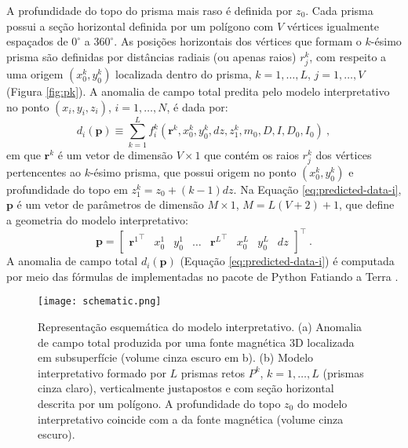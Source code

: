 A profundidade do topo do prisma mais raso é definida por $z_{0}$.
Cada prisma possui a seção horizontal definida por um polígono com $V$ vértices igualmente espaçados de $0^{\circ}$ a $360^{\circ}$.
As posições horizontais dos vértices que formam o $k$-ésimo prisma
são definidas por distâncias radiais (ou apenas raios) $r^{k}_{j}$, com respeito a uma origem $(x_{0}^{k}, y_{0}^{k})$ localizada dentro do prisma, $k = 1, \dots, L$, $j = 1, \dots, V$ (Figura \ref{fig:pk}).
A anomalia de campo total predita pelo modelo interpretativo no ponto $(x_{i}, y_{i}, z_{i})$, $i = 1, \dots, N$, é dada por:
\begin{equation}
d_{i} (\mathbf{p}) \equiv \sum\limits_{k=1}^{L} f_{i}^{k}(\mathbf{r}^{k}, x_{0}^{k}, y_{0}^{k}, dz, z_{1}^{k}, m_{0}, D, I, D_{0}, I_{0}) \: ,
\label{eq:predicted-data-i}
\end{equation}
em que $\mathbf{r}^{k}$ é um vetor de dimensão $V \times 1$ que contém os raios $r^{k}_{j}$ dos vértices pertencentes ao $k$-ésimo prisma, que possui origem no ponto $(x_{0}^{k}, y_{0}^{k})$ e profundidade do topo em $z_{1}^{k} = z_{0} + (k-1)dz$.
Na Equação \ref{eq:predicted-data-i}, $\mathbf{p}$ é um vetor de parâmetros de dimensão $M \times 1$, $ M=L(V+2) +1 $, que define a geometria do modelo interpretativo:
\begin{equation}
\mathbf{p} = \begin{bmatrix} 
{\mathbf{r}^{1}}^{\top} & x_{0}^{1} & y_{0}^{1} & \dots & 
{\mathbf{r}^{L}}^{\top} & x_{0}^{L} & y_{0}^{L} & dz
\end{bmatrix}^{\top} \: .
\label{eq:p-vector}
\end{equation}
A anomalia de campo total $d_{i} (\mathbf{p})$ 
(Equação \ref{eq:predicted-data-i}) é computada por meio das fórmulas de \cite{plouff1976} implementadas no pacote de Python 
Fatiando a Terra \citep{uieda-etal2013}.

\begin{figure}[!htb]
	\centering
	\texttt{[image: schematic.png]}
	\caption{Representação esquemática do modelo interpretativo. (a) Anomalia de campo total produzida por uma fonte magnética 3D localizada em subsuperfície (volume cinza escuro em b). (b) Modelo interpretativo formado por $ L $ prismas retos $ P^k$, $k = 1, \dots , L $ (prismas cinza claro), verticalmente justapostos e com seção horizontal descrita por um polígono. A profundidade do topo $z_0$ do modelo interpretativo coincide com a da fonte magnética (volume cinza escuro).}
	\label{fig:schematic}
\end{figure}

